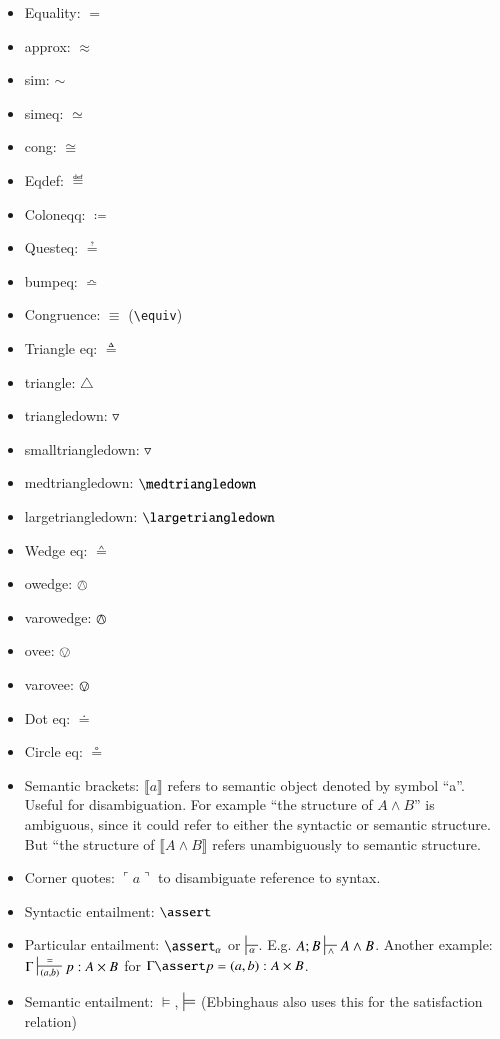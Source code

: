 \begin{itemize}
\item Equality: \(=\)
\item approx: \(\approx\)
\item sim: \(\sim\)
\item simeq: \(\simeq\)
\item cong: \(\cong\)
\item Eqdef: \(\eqdef\)
\item Coloneqq: \(\coloneqq\)
\item Questeq: \(\questeq\)
\item bumpeq: \(\bumpeq\)
\item Congruence: \(\equiv\) (\texttt{\textbackslash{}equiv})
\item Triangle eq: \(\triangleq\)
\item triangle: \(\triangle\)
\item triangledown: \(\triangledown\)
\item smalltriangledown: \(\smalltriangledown\)
\item medtriangledown: \(\medtriangledown\)
\item largetriangledown: \(\largetriangledown\)
\item Wedge eq: \(\wedgeq\)
\item owedge: \(\owedge\)
\item varowedge: \(\varowedge\)
\item ovee: \(\ovee\)
\item varovee: \(\varovee\)
\item Dot eq: \(\doteq\)
\item Circle eq: \(\circeq\)
\item Semantic brackets: \(\llbracket a\rrbracket\) refers to semantic
  object denoted by symbol ``a''. Useful for disambiguation. For
  example ``the structure of \(A\land B\)'' is ambiguous, since it
  could refer to either the syntactic or semantic structure. But ``the
  structure of \(\llbracket A\land B\rrbracket\) refers unambiguously
  to semantic structure.
\item Corner quotes: \(\ulcorner a\urcorner\) to disambiguate
  reference to syntax.
\item Syntactic entailment: \(\linfer\)
\item Particular entailment: \(\linfer_\alpha\) or
  \(\sststile{\alpha}{}\). E.g. \(A;B\sststile{\land}{}{A\land B}\).
  Another example: \(\Gamma\sststile{(a,b)}{=}{p:A\times B}\) for
  \(\Gamma\linfer p=(a,b):A\times B\).
\item Semantic entailment: \(\models\), \(\sdtstile{}{}\) (Ebbinghaus also uses this for the satisfaction relation)
\end{itemize}

